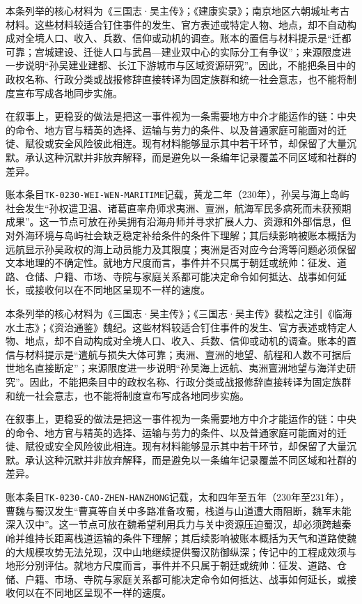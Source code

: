 本条列举的核心材料为《三国志·吴主传》；《建康实录》；南京地区六朝城址考古材料。这些材料较适合钉住事件的发生、官方表述或特定人物、地点，却不自动构成对全境人口、收入、兵数、信仰或动机的调查。账本的置信与材料提示是“迁都可靠；宫城建设、迁徙人口与武昌—建业双中心的实际分工有争议”；来源限度进一步说明“孙吴建业建都、长江下游城市与区域资源研究”。因此，不能把条目中的政权名称、行政分类或战报修辞直接转译为固定族群和统一社会意志，也不能将制度宣布写成各地同步实施。

在叙事上，更稳妥的做法是把这一事件视为一条需要地方中介才能运作的链：中央的命令、地方官与精英的选择、运输与劳力的条件、以及普通家庭可能面对的迁徙、赋役或安全风险彼此相连。现有材料能够显示其中若干环节，却保留了大量沉默。承认这种沉默并非放弃解释，而是避免以一条编年记录覆盖不同区域和社群的差异。

账本条目\texttt{TK-0230-WEI-WEN-MARITIME}记载，黄龙二年（230年），孙吴与海上岛屿社会发生“孙权遣卫温、诸葛直率舟师求夷洲、亶洲，航海军民多病死而未获预期成果”。这一节点可放在孙吴拥有沿海舟师并寻求扩展人力、资源和外部信息，但对外海环境与岛屿社会缺乏稳定补给条件的条件下理解；其后续影响被账本概括为远航显示孙吴政权的海上动员能力及其限度；夷洲是否对应今台湾等问题必须保留文本地理的不确定性。就地方尺度而言，事件并不只属于朝廷或统帅：征发、道路、仓储、户籍、市场、寺院与家庭关系都可能决定命令如何抵达、战事如何延长，或接收何以在不同地区呈现不一样的速度。

本条列举的核心材料为《三国志·吴主传》；《三国志·吴主传》裴松之注引《临海水土志》；《资治通鉴》魏纪。这些材料较适合钉住事件的发生、官方表述或特定人物、地点，却不自动构成对全境人口、收入、兵数、信仰或动机的调查。账本的置信与材料提示是“遣航与损失大体可靠；夷洲、亶洲的地望、航程和人数不可据后世地名直接断定”；来源限度进一步说明“孙吴海上远航、夷洲亶洲地望与海洋史研究”。因此，不能把条目中的政权名称、行政分类或战报修辞直接转译为固定族群和统一社会意志，也不能将制度宣布写成各地同步实施。

在叙事上，更稳妥的做法是把这一事件视为一条需要地方中介才能运作的链：中央的命令、地方官与精英的选择、运输与劳力的条件、以及普通家庭可能面对的迁徙、赋役或安全风险彼此相连。现有材料能够显示其中若干环节，却保留了大量沉默。承认这种沉默并非放弃解释，而是避免以一条编年记录覆盖不同区域和社群的差异。

账本条目\texttt{TK-0230-CAO-ZHEN-HANZHONG}记载，太和四年至五年（230年至231年），曹魏与蜀汉发生“曹真等自关中多路准备攻蜀，栈道与山道遭大雨阻断，魏军未能深入汉中”。这一节点可放在魏希望利用兵力与关中资源压迫蜀汉，却必须跨越秦岭并维持长距离栈道运输的条件下理解；其后续影响被账本概括为天气和道路使魏的大规模攻势无法兑现，汉中山地继续提供蜀汉防御纵深；传记中的工程成效须与地形分别评估。就地方尺度而言，事件并不只属于朝廷或统帅：征发、道路、仓储、户籍、市场、寺院与家庭关系都可能决定命令如何抵达、战事如何延长，或接收何以在不同地区呈现不一样的速度。

